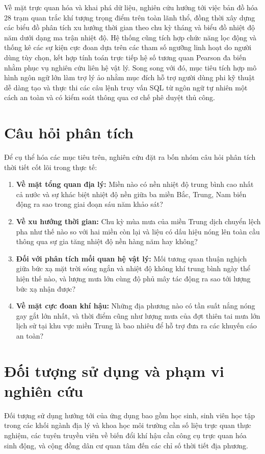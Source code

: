 Về mặt trực quan hóa và khai phá dữ liệu, nghiên cứu hướng tới việc bản đồ hóa 28 trạm quan trắc khí tượng trọng điểm trên toàn lãnh thổ, đồng thời xây dựng các biểu đồ phân tích xu hướng thời gian theo chu kỳ tháng và biểu đồ nhiệt độ năm dưới dạng ma trận nhiệt độ. Hệ thống cũng tích hợp chức năng lọc động và thống kê các sự kiện cực đoan dựa trên các tham số ngưỡng linh hoạt do người dùng tùy chọn, kết hợp tính toán trực tiếp hệ số tương quan Pearson đa biến nhằm phục vụ nghiên cứu liên hệ vật lý. Song song với đó, mục tiêu tích hợp mô hình ngôn ngữ lớn làm trợ lý ảo nhằm mục đích hỗ trợ người dùng phi kỹ thuật dễ dàng tạo và thực thi các câu lệnh truy vấn SQL từ ngôn ngữ tự nhiên một cách an toàn và có kiểm soát thông qua cơ chế phê duyệt thủ công.

\section{Câu hỏi phân tích}
Để cụ thể hóa các mục tiêu trên, nghiên cứu đặt ra bốn nhóm câu hỏi phân tích thời tiết cốt lõi trong thực tế:
\begin{enumerate}
    \item \textbf{Về mặt tổng quan địa lý:} Miền nào có nền nhiệt độ trung bình cao nhất cả nước và sự khác biệt nhiệt độ nền giữa ba miền Bắc, Trung, Nam biến động ra sao trong giai đoạn sáu năm khảo sát?
    \item \textbf{Về xu hướng thời gian:} Chu kỳ mùa mưa của miền Trung dịch chuyển lệch pha như thế nào so với hai miền còn lại và liệu có dấu hiệu nóng lên toàn cầu thông qua sự gia tăng nhiệt độ nền hàng năm hay không?
    \item \textbf{Đối với phân tích mối quan hệ vật lý:} Mối tương quan thuận nghịch giữa bức xạ mặt trời sóng ngắn và nhiệt độ không khí trung bình ngày thể hiện thế nào, và lượng mưa lớn cùng độ phủ mây tác động ra sao tới lượng bức xạ nhận được?
    \item \textbf{Về mặt cực đoan khí hậu:} Những địa phương nào có tần suất nắng nóng gay gắt lớn nhất, và thời điểm cũng như lượng mưa của đợt thiên tai mưa lớn lịch sử tại khu vực miền Trung là bao nhiêu để hỗ trợ đưa ra các khuyến cáo an toàn?
\end{enumerate}
\newpage
\section{Đối tượng sử dụng và phạm vi nghiên cứu}
Đối tượng sử dụng hướng tới của ứng dụng bao gồm học sinh, sinh viên học tập trong các khối ngành địa lý và khoa học môi trường cần số liệu trực quan thực nghiệm, các tuyên truyền viên về biến đổi khí hậu cần công cụ trực quan hóa sinh động, và cộng đồng dân cư quan tâm đến các chỉ số thời tiết địa phương.

